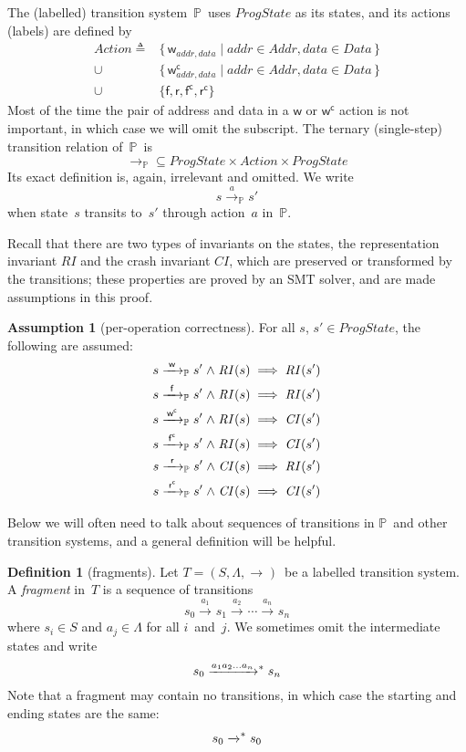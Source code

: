 \documentclass[letterpaper,twocolumn,10pt]{article}
\theoremstyle{definition}
\newtheorem{definition}[theorem]{Definition}
\newtheorem{assumption}[theorem]{Assumption}
\newcommand{\defeq}{{}\triangleq{}}
\newcommand{\conj}{\mathrel\land}
\newcommand{\awa}[2]{\hphantom{#1}\mathclap{#2}\hphantom{#1}} %
\renewcommand{\i}[1]{\ensuremath{\mathit{#1}}}
\newcommand{\Prog}{\ensuremath{\mathbb P}}
\newcommand{\actw}{\mathsf w}
\newcommand{\actwc}{\mathsf w^\mathsf{c}}
\newcommand{\actf}{\mathsf f}
\newcommand{\actr}{\mathsf r}
\newcommand{\actfc}{\mathsf{f^c}}
\newcommand{\actrc}{\mathsf{r^c}}
\newcommand{\ttIn}[2]{\xrightarrow{#1}_{#2}}
\newcommand{\ttsIn}[2]{\xrightarrow{#1}^{\raisebox{-3pt}{\scriptsize\ensuremath{*}}}_{#2}}
\newcommand{\ttP}[1]{\ttIn{#1}{\Prog}}
\begin{document}
The (labelled) transition system~\Prog\ uses \i{ProgState} as its states, and its actions (labels) are defined by%
\begin{align*}
	\i{Action} \defeq{} &\{\, \actw_{\i{addr}, \i{data}} \mid \i{addr} \in \i{Addr}, \i{data} \in \i{Data} \,\} \\
	\cup \ &\{\, \actwc_{\i{addr}, \i{data}} \mid \i{addr} \in \i{Addr}, \i{data} \in \i{Data} \,\}\\
	\cup \ &\{ \actf, \actr, \actfc, \actrc \}
\end{align*}
Most of the time the pair of address and data in a $\actw$ or $\actwc$ action is not important, in which case we will omit the subscript.
The ternary (single-step) transition relation of~\Prog\ is
$${\ttP{}} \subseteq \i{ProgState} \times \i{Action} \times \i{ProgState}$$
Its exact definition is, again, irrelevant and omitted.
We write
$$s \ttP{a} s'$$
when state~$s$ transits to~$s'$ through action~$a$ in~\Prog.

Recall that there are two types of invariants on the states, the representation invariant \i{RI} and the crash invariant \i{CI}, which are preserved or transformed by the transitions; these properties are proved by an SMT solver, and are made assumptions in this proof.
\begin{assumption}[per-operation correctness]
For all $s$, $s' \in \i{ProgState}$, the following are assumed:
\begin{align*}
s \ttP{\awa{\actw}{\actw }} s' \conj \i{RI}(s) &\implies \i{RI}(s')\\
s \ttP{\awa{\actw}{\actf }} s' \conj \i{RI}(s) &\implies \i{RI}(s')\\
s \ttP{\awa{\actw}{\actwc}} s' \conj \i{RI}(s) &\implies \i{CI}(s')\\
s \ttP{\awa{\actw}{\actfc}} s' \conj \i{RI}(s) &\implies \i{CI}(s')\\
s \ttP{\awa{\actw}{\actr }} s' \conj \i{CI}(s) &\implies \i{RI}(s')\\
s \ttP{\awa{\actw}{\actrc}} s' \conj \i{CI}(s) &\implies \i{CI}(s')
\end{align*}
\end{assumption}

Below we will often need to talk about sequences of transitions in \Prog\ and other transition systems, and a general definition will be helpful.
\begin{definition}[fragments]
Let $T = (S, \Lambda, \ttIn{}{})$~be a labelled transition system.
A \emph{fragment} in~$T$ is a sequence of transitions
$$ s_0 \ttIn{a_1}{} s_1 \ttIn{a_2}{} \cdots \ttIn{a_n}{} s_n $$
where $s_i \in S$ and $a_j \in \Lambda$ for all $i$~and~$j$.
We sometimes omit the intermediate states and write
$$ s_0 \ttsIn{a_1a_2\ldots a_n}{} s_n $$
Note that a fragment may contain no transitions, in which case the starting and ending states are the same: 
$$ s_0 \ttsIn{\vphantom{a_n}}{} s_0 $$
\end{definition}
\end{document}
